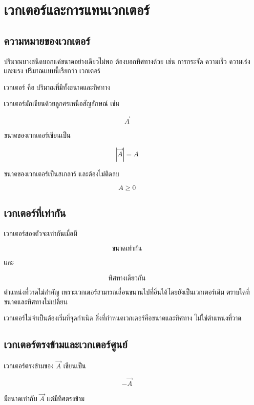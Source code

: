 \section{เวกเตอร์และการแทนเวกเตอร์}

\subsection{ความหมายของเวกเตอร์}

ปริมาณบางชนิดบอกแค่ขนาดอย่างเดียวไม่พอ ต้องบอกทิศทางด้วย เช่น การกระจัด ความเร็ว ความเร่ง และแรง ปริมาณแบบนี้เรียกว่า เวกเตอร์

\begin{tcolorbox}[title=นิยาม]
เวกเตอร์ คือ ปริมาณที่มีทั้งขนาดและทิศทาง
\end{tcolorbox}

เวกเตอร์มักเขียนด้วยลูกศรเหนือสัญลักษณ์ เช่น

\[
\vec{A}
\]

ขนาดของเวกเตอร์เขียนเป็น

\[
|\vec{A}|=A
\]

ขนาดของเวกเตอร์เป็นสเกลาร์ และต้องไม่ติดลบ

\[
A\geq 0
\]

\subsection{เวกเตอร์ที่เท่ากัน}

เวกเตอร์สองตัวจะเท่ากันเมื่อมี

\[
\text{ขนาดเท่ากัน}
\]

และ

\[
\text{ทิศทางเดียวกัน}
\]

ตำแหน่งที่วาดไม่สำคัญ เพราะเวกเตอร์สามารถเลื่อนขนานไปที่อื่นได้โดยยังเป็นเวกเตอร์เดิม ตราบใดที่ขนาดและทิศทางไม่เปลี่ยน

\begin{tcolorbox}[title=ข้อควรจำ]
เวกเตอร์ไม่จำเป็นต้องเริ่มที่จุดกำเนิด สิ่งที่กำหนดเวกเตอร์คือขนาดและทิศทาง ไม่ใช่ตำแหน่งที่วาด
\end{tcolorbox}

\subsection{เวกเตอร์ตรงข้ามและเวกเตอร์ศูนย์}

เวกเตอร์ตรงข้ามของ $\vec{A}$ เขียนเป็น

\[
-\vec{A}
\]

มีขนาดเท่ากับ $\vec{A}$ แต่มีทิศตรงข้าม

